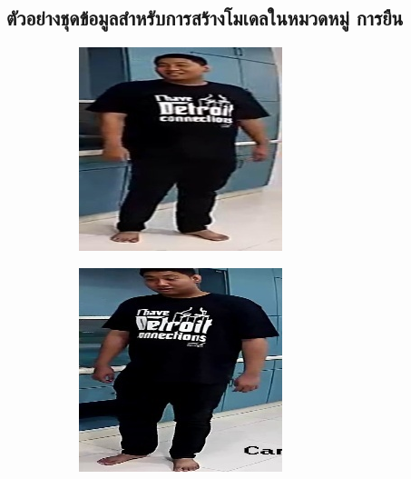 \clearpage
\subsection*{ตัวอย่างชุดข้อมูลสำหรับการสร้างโมเดลในหมวดหมู่ การยืน}
\begin{figure}[!ht]
    \centering
   \begin{subfigure}[b]{0.45\linewidth}
      \includegraphics[width=\linewidth]{appendix/stand/000_CXS0_D0_001005.jpg}
    \end{subfigure}
    \begin{subfigure}[b]{0.45\linewidth}
      \includegraphics[width=\linewidth]{appendix/stand/000_CXS0_D0_001045.jpg}

\end{subfigure}
\end{figure}
